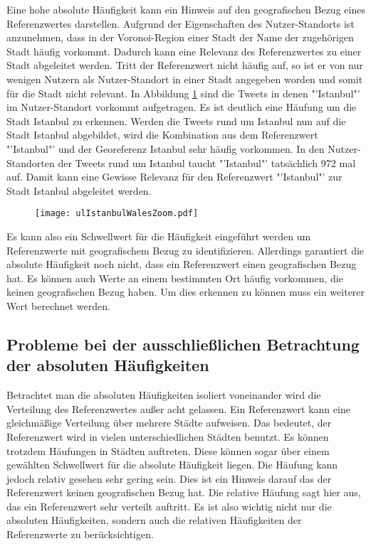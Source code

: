 				Eine hohe absolute Häufigkeit kann ein Hinweis auf den geografischen Bezug eines Referenzwertes darstellen. 
				Aufgrund der Eigenschaften des Nutzer-Standorts ist anzunehmen, dass in der Voronoi-Region einer Stadt der Name der zugehörigen Stadt häufig vorkommt.
				Dadurch kann eine Relevanz des Referenzwertes zu einer Stadt abgeleitet werden. 
				Tritt der Referenzwert nicht häufig auf, so ist er von nur wenigen Nutzern als Nutzer-Standort in einer Stadt angegeben worden und somit für die Stadt nicht relevant.
				In Abbildung \ref{img:ulIstanbulWalesZoom} sind die Tweets in denen "'Istanbul"' im Nutzer-Standort vorkommt aufgetragen.
				Es ist deutlich eine Häufung um die Stadt Istanbul zu erkennen. 
				Werden die Tweets rund um Istanbul nun auf die Stadt Istanbul abgebildet, wird die Kombination aus dem Referenzwert "'Istanbul"' und der Georeferenz Istanbul sehr häufig vorkommen.
				In den Nutzer-Standorten der Tweets rund um Istanbul taucht "'Istanbul"' tatsächlich 972 mal auf.
				Damit kann eine Gewisse Relevanz für den Referenzwert "'Istanbul"' zur Stadt Istanbul abgeleitet werden.

				\begin{figure}[!ht]
						\begin{center}
							\texttt{[image: ulIstanbulWalesZoom.pdf]}
							\caption{}
							\label{img:ulIstanbulWalesZoom}
						\end{center}
				\end{figure}	

				Es kann also ein Schwellwert für die Häufigkeit eingeführt werden um Referenzwerte mit geografischem Bezug zu identifizieren.
				Allerdings garantiert die absolute Häufigkeit noch nicht, dass ein Referenzwert einen geografischen Bezug hat. 
				Es können auch Werte an einem bestimmten Ort häufig vorkommen, die keinen geografischen Bezug haben.
				Um dies erkennen zu können muss ein weiterer Wert berechnet werden.

		\subsection{Probleme bei der ausschließlichen Betrachtung der absoluten Häufigkeiten} 

			Betrachtet man die absoluten Häufigkeiten isoliert voneinander wird die Verteilung des Referenzwertes außer acht gelassen. 
			Ein Referenzwert kann eine gleichmäßige Verteilung über mehrere Städte aufweisen.
			Das bedeutet, der Referenzwert wird in vielen unterschiedlichen Städten benutzt. 
			Es können trotzdem Häufungen in Städten auftreten.
			Diese können sogar über einem gewählten Schwellwert für die absolute Häufigkeit liegen.
			Die Häufung kann jedoch relativ gesehen sehr gering sein.
			Dies ist ein Hinweis darauf das der Referenzwert keinen geografischen Bezug hat.
			Die relative Häufung sagt hier aus, das ein Referenzwert sehr verteilt auftritt. 
			Es ist also wichtig nicht nur die absoluten Häufigkeiten, sondern auch die relativen Häufigkeiten der Referenzwerte zu berücksichtigen.

